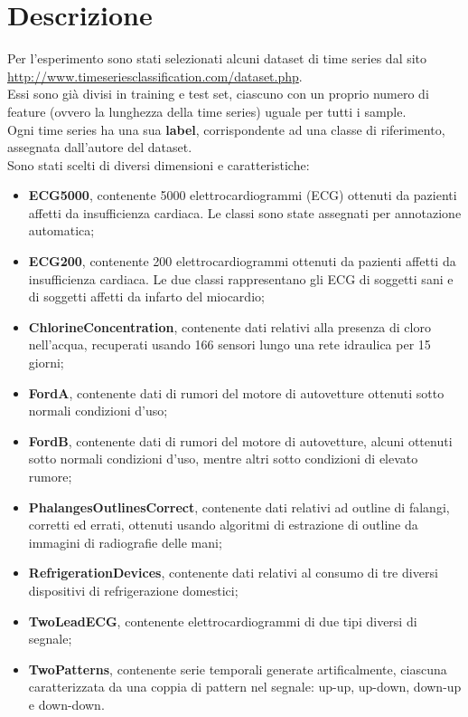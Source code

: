 \section{Descrizione}
Per l'esperimento sono stati selezionati alcuni dataset di time series dal sito \url{http://www.timeseriesclassification.com/dataset.php}.\\
Essi sono già divisi in training e test set, ciascuno con un proprio numero di feature (ovvero la lunghezza della time series) uguale per tutti i sample.\\
Ogni time series ha una sua \textbf{label}, corrispondente ad una classe di riferimento, assegnata dall'autore del dataset.\\
Sono stati scelti di diversi dimensioni e caratteristiche:
\begin{itemize}
	\item \textbf{ECG5000}, contenente 5000 elettrocardiogrammi (ECG) ottenuti da pazienti affetti da insufficienza cardiaca. Le classi sono state assegnati per annotazione automatica;
	\item \textbf{ECG200}, contenente 200 elettrocardiogrammi ottenuti da pazienti affetti da insufficienza cardiaca. Le due classi rappresentano gli ECG di soggetti sani e di soggetti affetti da infarto del miocardio;
	\item \textbf{ChlorineConcentration}, contenente dati relativi alla presenza di cloro nell'acqua, recuperati usando 166 sensori lungo una rete idraulica per 15 giorni;
	\item \textbf{FordA}, contenente dati di rumori del motore di autovetture ottenuti sotto normali condizioni d'uso;
	\item \textbf{FordB}, contenente dati di rumori del motore di autovetture, alcuni ottenuti sotto normali condizioni d'uso, mentre altri sotto condizioni di elevato rumore;
	\item \textbf{PhalangesOutlinesCorrect}, contenente dati relativi ad outline di falangi, corretti ed errati, ottenuti usando algoritmi di estrazione di outline da immagini di radiografie delle mani;
	\item \textbf{RefrigerationDevices}, contenente dati relativi al consumo di tre diversi dispositivi di refrigerazione domestici;
	\item \textbf{TwoLeadECG}, contenente elettrocardiogrammi di due tipi diversi di segnale;
	\item \textbf{TwoPatterns}, contenente serie temporali generate artificalmente, ciascuna caratterizzata da una coppia di pattern nel segnale: up-up, up-down, down-up e down-down.
\end{itemize}

